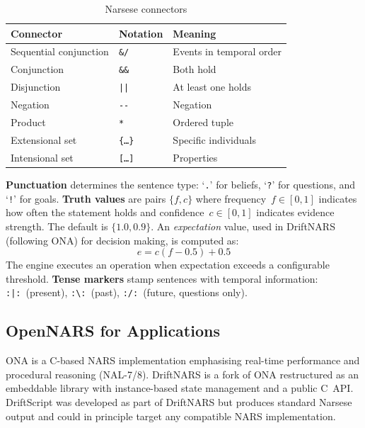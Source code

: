 \documentclass[11pt,a4paper]{article}
\begin{document}
\begin{table}[h]
\centering
\caption{Narsese connectors}
\label{tab:connectors}
\begin{tabular}{lll}
\toprule
\textbf{Connector} & \textbf{Notation} & \textbf{Meaning} \\
\midrule
Sequential conjunction & \texttt{\&/} & Events in temporal order \\
Conjunction & \texttt{\&\&} & Both hold \\
Disjunction & \texttt{||} & At least one holds \\
Negation & \texttt{-{}-} & Negation \\
Product & \texttt{*} & Ordered tuple \\
Extensional set & \texttt{\{\ldots\}} & Specific individuals \\
Intensional set & \texttt{[\ldots]} & Properties \\
\bottomrule
\end{tabular}
\end{table}

\textbf{Punctuation} determines the sentence type: `\texttt{.}' for beliefs,
`\texttt{?}' for questions, and `\texttt{!}' for goals.
\textbf{Truth values} are pairs $\{f, c\}$ where frequency~$f \in [0,1]$
indicates how often the statement holds and confidence~$c \in [0,1]$ indicates
evidence strength. The default is $\{1.0, 0.9\}$. An \emph{expectation}
value, used in DriftNARS (following ONA) for decision making, is computed as:
\begin{equation}
e = c(f - 0.5) + 0.5
\end{equation}
The engine executes an operation when expectation exceeds a configurable
threshold.
\textbf{Tense markers} stamp sentences with temporal information:
\texttt{:|:}~(present), \texttt{:\textbackslash:}~(past),
\texttt{:/:}~(future, questions only).

\subsection{OpenNARS for Applications}

ONA \citep{hammer2020opennars} is a C-based NARS implementation emphasising
real-time performance and procedural reasoning (NAL-7/8). DriftNARS
\citep{brady2024driftnars} is a fork of ONA restructured as an embeddable
library with instance-based state management and a public C~API. DriftScript
was developed as part of DriftNARS but produces standard Narsese output and
could in principle target any compatible NARS implementation.
\end{document}
